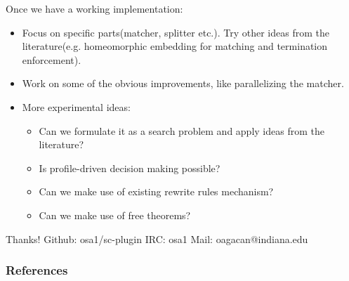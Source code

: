 \documentclass{beamer}
\begin{document}
\begin{frame}
    Once we have a working implementation:
    \begin{itemize}
        \item
            Focus on specific parts(matcher, splitter etc.). Try other ideas
            from the literature(e.g. homeomorphic embedding for matching and
            termination enforcement).
        \item
            Work on some of the obvious improvements, like parallelizing
            the matcher.
        \item
            More experimental ideas:
            \begin{itemize}
                \item[]
                    Can we formulate it as a search problem and apply ideas from
                    the literature?
                \item[]
                    Is profile-driven decision making possible?
                \item[]
                    Can we make use of existing rewrite rules mechanism?
                \item[]
                    Can we make use of free theorems?
            \end{itemize}
    \end{itemize}

    \bigskip
    Thanks!
    \newline
    Github: osa1/sc-plugin \hspace{0.3cm} IRC: osa1 \hspace{0.3cm} Mail:
    oagacan@indiana.edu
\end{frame}

\begin{frame}[allowframebreaks]
    \frametitle{References}

    
    
\end{frame}
\end{document}
